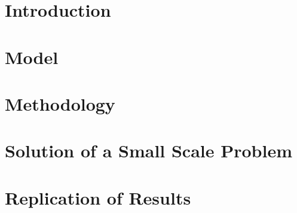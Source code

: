\documentclass[12pt]{report}
\begin{document}
    
    
    \chapter{Introduction}
        \doublespacing
        
    
    \singlespacing
    \chapter{Model}
        \doublespacing
        
    
    \singlespacing
    \chapter{Methodology}
        \doublespacing
        
        
    \singlespacing
    \chapter{Solution of a Small Scale Problem}
        \doublespacing
        
        
    \singlespacing
    \chapter{Replication of Results}
        \doublespacing
        
    
        
        
    \newpage
    
    
    
\end{document}

